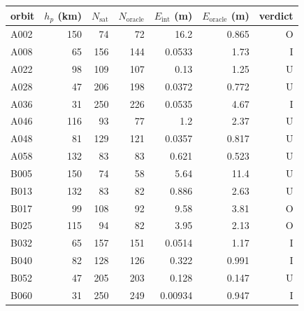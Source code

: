 \begin{tabular}{@{}l r r r r r r@{}}
\toprule
orbit & $h_p$ (km) & $N_{\mathrm{sat}}$ & $N_{\mathrm{oracle}}$ & $E_{\mathrm{int}}$ (m) & $E_{\mathrm{oracle}}$ (m) & verdict \\
\midrule
A002 & 150 & 74 & 72 & 16.2 & 0.865 & O \\
A008 & 65 & 156 & 144 & 0.0533 & 1.73 & I \\
A022 & 98 & 109 & 107 & 0.13 & 1.25 & U \\
A028 & 47 & 206 & 198 & 0.0372 & 0.772 & U \\
A036 & 31 & 250 & 226 & 0.0535 & 4.67 & I \\
A046 & 116 & 93 & 77 & 1.2 & 2.37 & U \\
A048 & 81 & 129 & 121 & 0.0357 & 0.817 & U \\
A058 & 132 & 83 & 83 & 0.621 & 0.523 & U \\
B005 & 150 & 74 & 58 & 5.64 & 11.4 & U \\
B013 & 132 & 83 & 82 & 0.886 & 2.63 & U \\
B017 & 99 & 108 & 92 & 9.58 & 3.81 & O \\
B025 & 115 & 94 & 82 & 3.95 & 2.13 & O \\
B032 & 65 & 157 & 151 & 0.0514 & 1.17 & I \\
B040 & 82 & 128 & 126 & 0.322 & 0.991 & I \\
B052 & 47 & 205 & 203 & 0.128 & 0.147 & U \\
B060 & 31 & 250 & 249 & 0.00934 & 0.947 & I \\
\bottomrule
\end{tabular}
